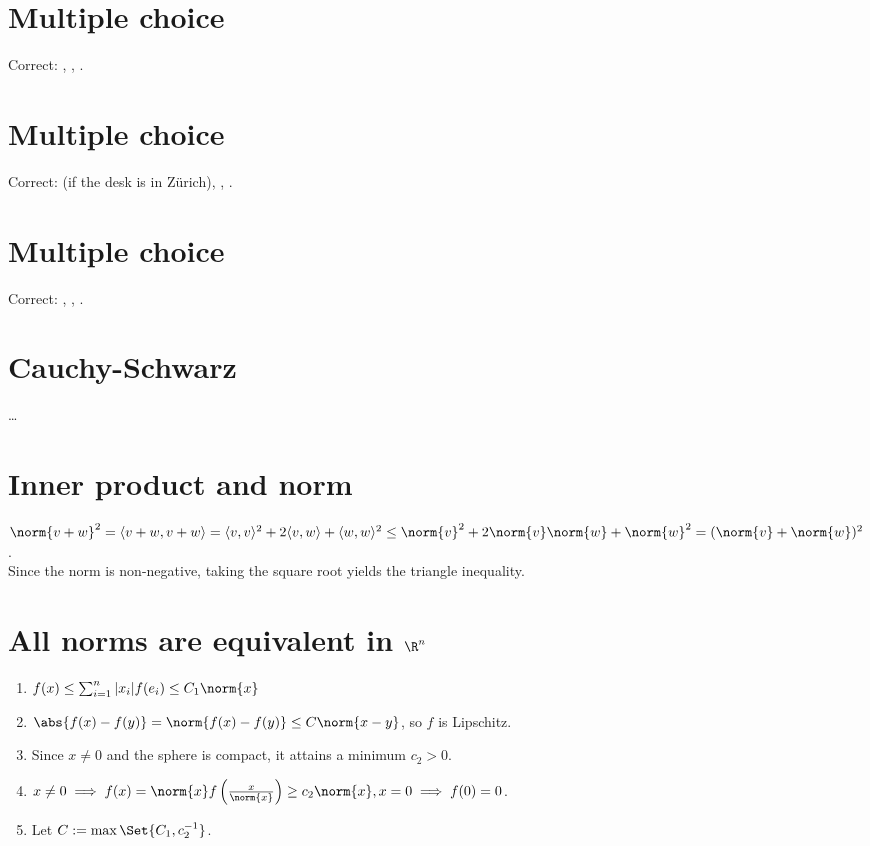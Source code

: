 \documentclass{article}
\begin{document}
\newpage

\section{Multiple choice}
Correct: , , . 

\section{Multiple choice}
Correct:  (if the desk is in Zürich), , . 

\section{Multiple choice}
Correct: , , . 

\section{Cauchy-Schwarz}
\dots

\section{Inner product and norm}
$\norm{v + w}^2 = \langle v + w, v + w\rangle 
= \langle v, v\rangle^2 + 2\langle v, w\rangle + \langle w, w\rangle^2
\leq \norm{v}^2 + 2\norm{v}\norm{w} + \norm{w}^2 = (\norm{v} + \norm{w})^2$. \\
Since the norm is non-negative, taking the square root yields the triangle inequality.

\section{All norms are equivalent in $\R^n$}
\begin{enumerate}
    \item $f(x) \leq \sum_{i=1}^n |x_i| f(e_i) \leq C_1 \norm{x}$
    \item $\abs{f(x) - f(y)} = \norm{f(x) - f(y)} \leq C \norm{x - y}$, so $f$ is Lipschitz.
    \item Since $x \neq 0$ and the sphere is compact, it attains a minimum $c_2 > 0$.  
    \item $x \neq 0 \implies f(x) = \norm{x} f\left(\frac{x}{\norm{x}}\right) \geq c_2 \norm{x}, x = 0 \implies f(0) = 0$. 
    \item Let $C := \max \Set{C_1, c_2^{-1}}$. 
\end{enumerate}
\end{document}
